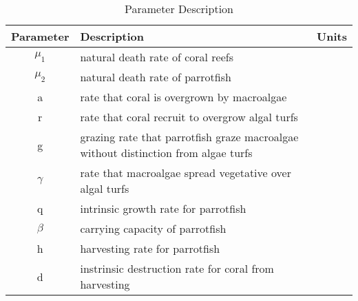 \documentclass[12pt]{article}
\begin{document}
\begin{table}[H]
    \centering
    \begin{tabular}{c p{10cm} c}
        \hline
        Parameter & Description & Units  \\
        \hline
        $\mu_{1}$ & natural death rate of coral reefs & \\
        $\mu_{2}$ & natural death rate of parrotfish & \\
        a & rate that coral is overgrown by macroalgae & \\
        r & rate that coral recruit to overgrow algal turfs & \\
        g & grazing rate that parrotfish graze macroalgae without distinction from algae turfs & \\
        $\gamma$ & rate that macroalgae spread vegetative over algal turfs & \\
        q & intrinsic growth rate for parrotfish & \\
        $\beta$ & carrying capacity of parrotfish & \\
        h & harvesting rate for parrotfish & \\
        d & instrinsic destruction rate for coral from harvesting & \\
         \hline
    \end{tabular}
    \caption{Parameter Description}
    \label{tab:my_label}
\end{table}

\end{document}
